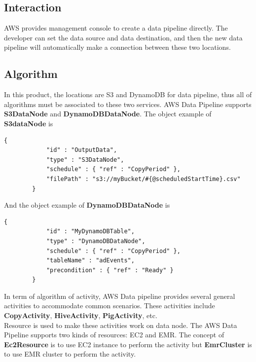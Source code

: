 	\subsection{Interaction}
	AWS provides management console to create a data pipeline directly. The developer can set the data source and data destination, and then the new data pipeline will automatically make  a connection between these two locations.  
    
\subsection{ Algorithm}
	In this product, the locations are S3 and DynamoDB for data pipeline, thus all of algorithms must be associated to these two services. AWS Data Pipeline supports \textbf{S3DataNode} and \textbf{DynamoDBDataNode}. The  object example of \textbf{S3dataNode} is

	\begin{lstlisting}[caption=S3 Data Node example\cite{z6}]
        {
            "id" : "OutputData",
            "type" : "S3DataNode",
            "schedule" : { "ref" : "CopyPeriod" },
            "filePath" : "s3://myBucket/#{@scheduledStartTime}.csv"
        }
	\end{lstlisting}
	And the object example of \textbf{DynamoDBDataNode} is 
	\begin{lstlisting}[caption=DynamoDB Data Node example\cite{z7}]
        {
            "id" : "MyDynamoDBTable",
            "type" : "DynamoDBDataNode",
            "schedule" : { "ref" : "CopyPeriod" },
            "tableName" : "adEvents",
            "precondition" : { "ref" : "Ready" }
        }
	\end{lstlisting}

	In term of algorithm of activity, AWS Data pipeline provides several general activities to accommodate common scenarios. These activities include \textbf{CopyActivity}, \textbf{HiveActivity}, \textbf{PigActivity}, etc.\\ 
    
    \noindent Resource is used to make these activities work on data node. The AWS Data Pipeline supports two kinds of resources: EC2 and EMR. The concept of \textbf{Ec2Resource} is to use EC2 instance to perform the activity but \textbf{EmrCluster} is to use EMR cluster to perform the activity. 


